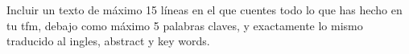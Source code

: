 
Incluir un texto de máximo 15 líneas en el que cuentes todo lo que has hecho en tu  tfm, debajo como máximo 5 palabras claves, y exactamente lo mismo traducido al ingles, abstract y key words.
